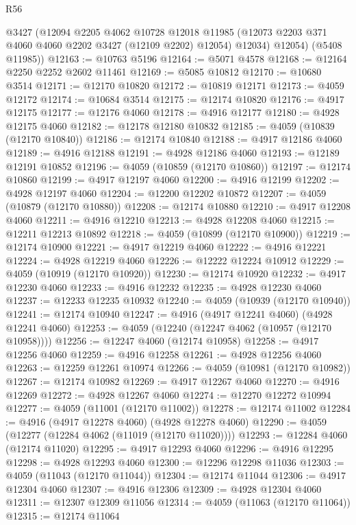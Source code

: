 \begin{lexlean}{R56}
\begin{coremodule}
        @3427
        (@12094
          @2205
          @4062
          @10728
          @12018
          @11985
          (@12073 @2203 @371 @4060 @4060 @2202 @3427 (@12109 @2202) @12054)
          @12034)
        @12054)
      (@5408 @11985))
@12163 := @10763 @5196
@12164 := @5071 @4578
@12168 := @12164 @2250 @2252 @2602 @11461
@12169 := @5085 @10812
@12170 := @10680 @3514
@12171 := @12170 @10820
@12172 := @10819 @12171
@12173 := @4059 @12172
@12174 := @10684 @3514
@12175 := @12174 @10820
@12176 := @4917 @12175
@12177 := @12176 @4060
@12178 := @4916 @12177
@12180 := @4928 @12175 @4060
@12182 := @12178 @12180 @10832
@12185 := @4059 (@10839 (@12170 @10840))
@12186 := @12174 @10840
@12188 := @4917 @12186 @4060
@12189 := @4916 @12188
@12191 := @4928 @12186 @4060
@12193 := @12189 @12191 @10852
@12196 := @4059 (@10859 (@12170 @10860))
@12197 := @12174 @10860
@12199 := @4917 @12197 @4060
@12200 := @4916 @12199
@12202 := @4928 @12197 @4060
@12204 := @12200 @12202 @10872
@12207 := @4059 (@10879 (@12170 @10880))
@12208 := @12174 @10880
@12210 := @4917 @12208 @4060
@12211 := @4916 @12210
@12213 := @4928 @12208 @4060
@12215 := @12211 @12213 @10892
@12218 := @4059 (@10899 (@12170 @10900))
@12219 := @12174 @10900
@12221 := @4917 @12219 @4060
@12222 := @4916 @12221
@12224 := @4928 @12219 @4060
@12226 := @12222 @12224 @10912
@12229 := @4059 (@10919 (@12170 @10920))
@12230 := @12174 @10920
@12232 := @4917 @12230 @4060
@12233 := @4916 @12232
@12235 := @4928 @12230 @4060
@12237 := @12233 @12235 @10932
@12240 := @4059 (@10939 (@12170 @10940))
@12241 := @12174 @10940
@12247 := @4916 (@4917 @12241 @4060) (@4928 @12241 @4060)
@12253 := @4059 (@12240 (@12247 @4062 (@10957 (@12170 @10958))))
@12256 := @12247 @4060 (@12174 @10958)
@12258 := @4917 @12256 @4060
@12259 := @4916 @12258
@12261 := @4928 @12256 @4060
@12263 := @12259 @12261 @10974
@12266 := @4059 (@10981 (@12170 @10982))
@12267 := @12174 @10982
@12269 := @4917 @12267 @4060
@12270 := @4916 @12269
@12272 := @4928 @12267 @4060
@12274 := @12270 @12272 @10994
@12277 := @4059 (@11001 (@12170 @11002))
@12278 := @12174 @11002
@12284 := @4916 (@4917 @12278 @4060) (@4928 @12278 @4060)
@12290 := @4059 (@12277 (@12284 @4062 (@11019 (@12170 @11020))))
@12293 := @12284 @4060 (@12174 @11020)
@12295 := @4917 @12293 @4060
@12296 := @4916 @12295
@12298 := @4928 @12293 @4060
@12300 := @12296 @12298 @11036
@12303 := @4059 (@11043 (@12170 @11044))
@12304 := @12174 @11044
@12306 := @4917 @12304 @4060
@12307 := @4916 @12306
@12309 := @4928 @12304 @4060
@12311 := @12307 @12309 @11056
@12314 := @4059 (@11063 (@12170 @11064))
@12315 := @12174 @11064

\end{coremodule}
\end{lexlean}

